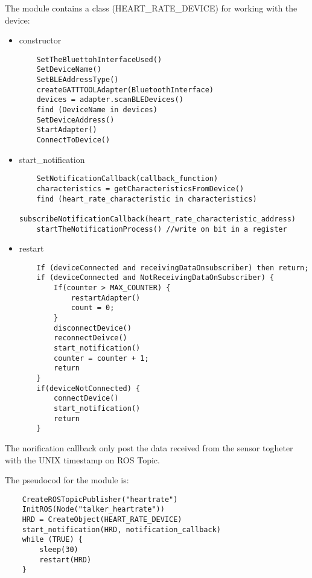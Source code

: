 The module contains a class (HEART_RATE_DEVICE) for working with the device:
\begin{itemize}
\item constructor
\begin{lstlisting}
    SetTheBluettohInterfaceUsed()
    SetDeviceName()
    SetBLEAddressType()
    createGATTTOOLAdapter(BluetoothInterface)
    devices = adapter.scanBLEDevices()
    find (DeviceName in devices)
    SetDeviceAddress()
    StartAdapter()
    ConnectToDevice()
\end{lstlisting}

\item start_notification
\begin{lstlisting}
    SetNotificationCallback(callback_function)
    characteristics = getCharacteristicsFromDevice()
    find (heart_rate_characteristic in characteristics)
    subscribeNotificationCallback(heart_rate_characteristic_address)
    startTheNotificationProcess() //write on bit in a register
\end{lstlisting}

\item restart
\begin{lstlisting}
    If (deviceConnected and receivingDataOnsubscriber) then return;
    if (deviceConnected and NotReceivingDataOnSubscriber) {
        If(counter > MAX_COUNTER) {
            restartAdapter()
            count = 0;
        }
        disconnectDevice()
        reconnectDeivce()
        start_notification()
        counter = counter + 1;
        return
    }
    if(deviceNotConnected) {
        connectDevice()
        start_notification()
        return
    }
\end{lstlisting}
\end{itemize}

The norification callback only post the data received from the sensor
togheter with the UNIX timestamp on ROS Topic.

 The pseudocod for the module is:
\begin{lstlisting}
    CreateROSTopicPublisher("heartrate")
    InitROS(Node("talker_heartrate"))
    HRD = CreateObject(HEART_RATE_DEVICE)
    start_notification(HRD, notification_callback)
    while (TRUE) {
        sleep(30)
        restart(HRD)
    }
\end{lstlisting}

